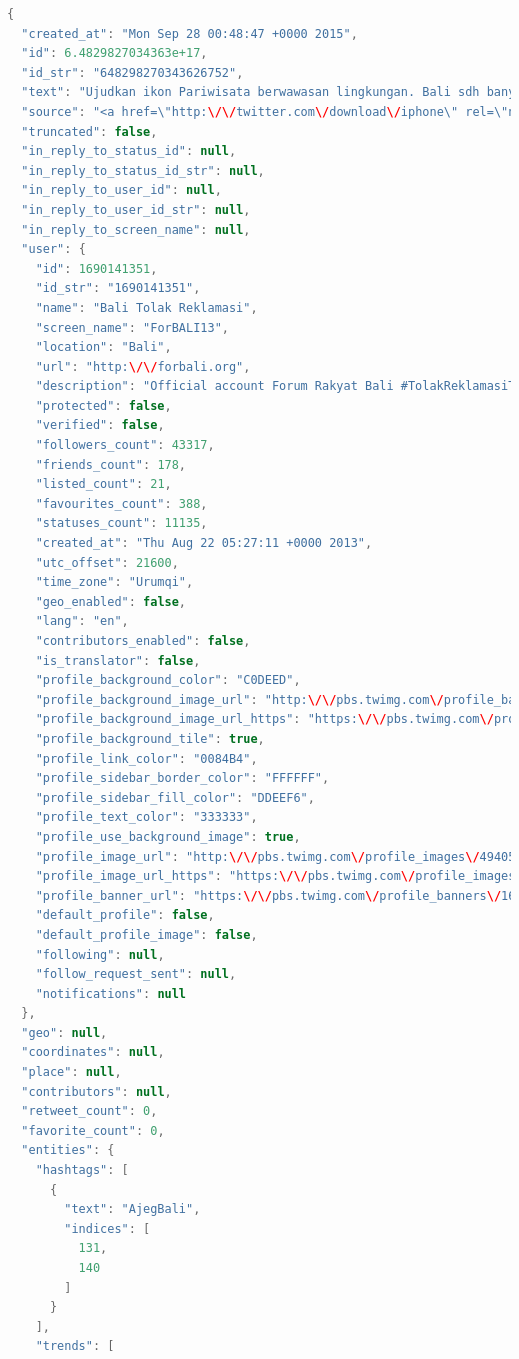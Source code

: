 \begin{lstlisting}[language=Java,basicstyle=\tiny,caption=Hasil Streaming]
{
  "created_at": "Mon Sep 28 00:48:47 +0000 2015",
  "id": 6.4829827034363e+17,
  "id_str": "648298270343626752",
  "text": "Ujudkan ikon Pariwisata berwawasan lingkungan. Bali sdh banyak bermasalah dg air, fungsi lahan, dan sampah. http:\/\/t.co\/mj8l3D4xvy #AjegBali",
  "source": "<a href=\"http:\/\/twitter.com\/download\/iphone\" rel=\"nofollow\">Twitter for iPhone<\/a>",
  "truncated": false,
  "in_reply_to_status_id": null,
  "in_reply_to_status_id_str": null,
  "in_reply_to_user_id": null,
  "in_reply_to_user_id_str": null,
  "in_reply_to_screen_name": null,
  "user": {
    "id": 1690141351,
    "id_str": "1690141351",
    "name": "Bali Tolak Reklamasi",
    "screen_name": "ForBALI13",
    "location": "Bali",
    "url": "http:\/\/forbali.org",
    "description": "Official account Forum Rakyat Bali #TolakReklamasiTelukBenoa | Petisi: http:\/\/chn.ge\/1kyV5Bu | Ganti Profpic: http:\/\/twibbon.com\/support\/forbali-2",
    "protected": false,
    "verified": false,
    "followers_count": 43317,
    "friends_count": 178,
    "listed_count": 21,
    "favourites_count": 388,
    "statuses_count": 11135,
    "created_at": "Thu Aug 22 05:27:11 +0000 2013",
    "utc_offset": 21600,
    "time_zone": "Urumqi",
    "geo_enabled": false,
    "lang": "en",
    "contributors_enabled": false,
    "is_translator": false,
    "profile_background_color": "C0DEED",
    "profile_background_image_url": "http:\/\/pbs.twimg.com\/profile_background_images\/378800000077490261\/b733ff1364e61ccf11b48d972a419799.jpeg",
    "profile_background_image_url_https": "https:\/\/pbs.twimg.com\/profile_background_images\/378800000077490261\/b733ff1364e61ccf11b48d972a419799.jpeg",
    "profile_background_tile": true,
    "profile_link_color": "0084B4",
    "profile_sidebar_border_color": "FFFFFF",
    "profile_sidebar_fill_color": "DDEEF6",
    "profile_text_color": "333333",
    "profile_use_background_image": true,
    "profile_image_url": "http:\/\/pbs.twimg.com\/profile_images\/494053969430200320\/X2xjdPf-_normal.png",
    "profile_image_url_https": "https:\/\/pbs.twimg.com\/profile_images\/494053969430200320\/X2xjdPf-_normal.png",
    "profile_banner_url": "https:\/\/pbs.twimg.com\/profile_banners\/1690141351\/1402672316",
    "default_profile": false,
    "default_profile_image": false,
    "following": null,
    "follow_request_sent": null,
    "notifications": null
  },
  "geo": null,
  "coordinates": null,
  "place": null,
  "contributors": null,
  "retweet_count": 0,
  "favorite_count": 0,
  "entities": {
    "hashtags": [
      {
        "text": "AjegBali",
        "indices": [
          131,
          140
        ]
      }
    ],
    "trends": [
      

\end{lstlisting}
